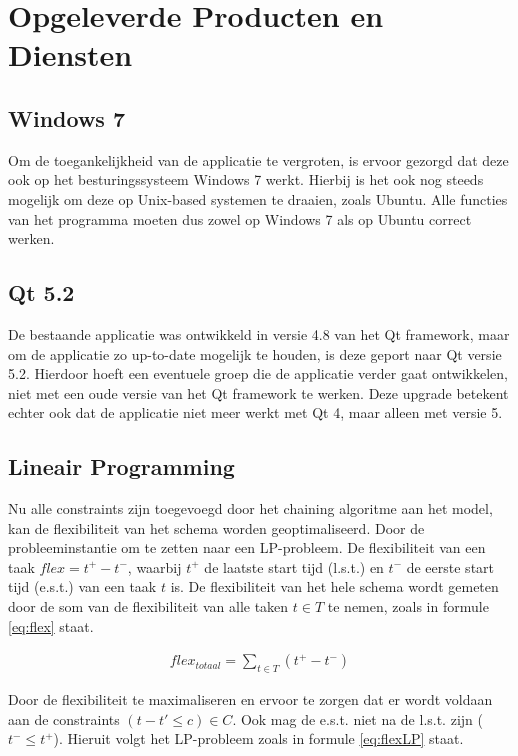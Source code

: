 \section{Opgeleverde Producten en Diensten}

\subsection{Windows 7}
Om de toegankelijkheid van de applicatie te vergroten, is ervoor gezorgd dat deze ook op het besturingssysteem Windows 7 werkt. Hierbij is het ook nog steeds mogelijk om deze op Unix-based systemen te draaien, zoals Ubuntu. Alle functies van het programma moeten dus zowel op Windows 7 als op Ubuntu correct werken.

\subsection{Qt 5.2}
De bestaande applicatie was ontwikkeld in versie 4.8 van het Qt framework, maar om de applicatie zo up-to-date mogelijk te houden, is deze geport naar Qt versie 5.2. Hierdoor hoeft een eventuele groep die de applicatie verder gaat ontwikkelen, niet met een oude versie van het Qt framework te werken. Deze upgrade betekent echter ook dat de applicatie niet meer werkt met Qt 4, maar alleen met versie 5.

\subsection{Lineair Programming}
Nu alle constraints zijn toegevoegd door het chaining algoritme aan het model, kan de flexibiliteit van het schema worden geoptimaliseerd. Door de probleeminstantie om te zetten naar een LP-probleem. De flexibiliteit van een taak $flex = t^+ - t^-$, waarbij $t^+$ de laatste start tijd (l.s.t.) en $t^-$ de eerste start tijd (e.s.t.) van een taak $t$ is. De flexibiliteit van het hele schema wordt gemeten door de som van de flexibiliteit van alle taken $t \in T$ te nemen, zoals in formule \ref{eq:flex} staat. 

\begin{align}
\label{eq:flex}
    flex_{totaal} = \sum_{t \in T} (t^+ - t^-)
\end{align}

Door de flexibiliteit te maximaliseren en ervoor te zorgen dat er wordt voldaan aan de constraints $(t - t' \leq c) \in C$. Ook mag de e.s.t. niet na de l.s.t. zijn ($t^- \leq t^+$). Hieruit volgt het LP-probleem zoals in formule \ref{eq:flexLP} staat.

